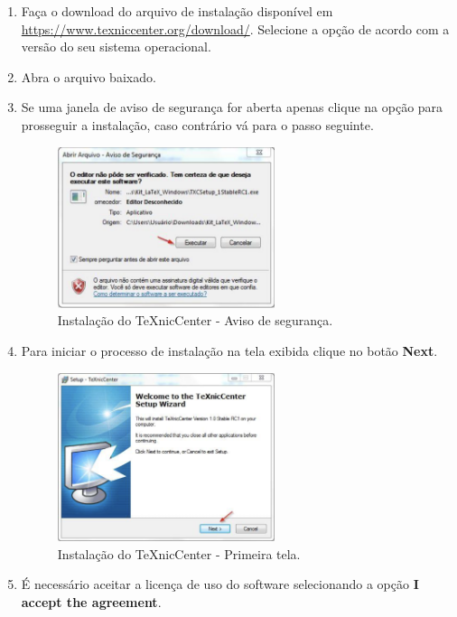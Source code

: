 \begin{enumerate}
\item Faça o download do arquivo de instalação disponível em \url{https://www.texniccenter.org/download/}. Selecione a opção de acordo com a versão do seu sistema operacional. 
\item Abra o arquivo baixado.
\item Se uma janela de aviso de segurança for aberta apenas clique na opção  para prosseguir a instalação, caso contrário vá para o passo seguinte.
\begin{figure}[H]
  \centering
  \includegraphics[width=0.6\textwidth]{./fig/texniccenter01}
  \caption{Instalação do TeXnicCenter - Aviso de segurança.}
\end{figure}
\item Para iniciar o processo de instalação na tela exibida clique no botão \textbf{Next}.
\begin{figure}[H]
  \centering
  \includegraphics[width=0.6\textwidth]{./fig/texniccenter02}
  \caption{Instalação do TeXnicCenter - Primeira tela.}
\end{figure}
\item É necessário aceitar a licença de uso do software selecionando a opção \textbf{I accept the agreement}.
\begin{figure}[H]

\end{figure}
\end{enumerate}
